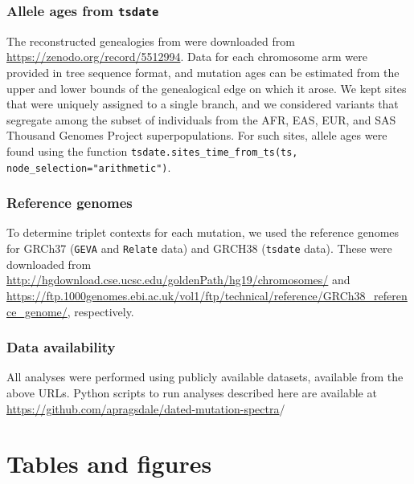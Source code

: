 \documentclass[]{article}
\newcommand{\GEVA}{\texttt{GEVA}\xspace}
\newcommand{\tsdate}{\texttt{tsdate}\xspace}
\newcommand{\relate}{\texttt{Relate}\xspace}
\begin{document}
\subsubsection*{Allele ages from \tsdate}

The reconstructed genealogies from \citet{wohns2022unified} were downloaded
from \url{https://zenodo.org/record/5512994}. Data for each chromosome arm were
provided in tree sequence format, and mutation ages can be estimated from the
upper and lower bounds of the genealogical edge on which it arose. We kept
sites that were uniquely assigned to a single branch, and we considered
variants that segregate among the subset of individuals from the AFR, EAS, EUR,
and SAS Thousand Genomes Project superpopulations. For such sites, allele ages
were found using the function \texttt{tsdate.sites\_time\_from\_ts(ts,
node\_selection="arithmetic")}.

\subsubsection*{Reference genomes} To determine triplet contexts for each
mutation, we used the reference genomes for GRCh37 (\GEVA and \relate data) and
GRCH38 (\tsdate data). These were downloaded from
\url{http://hgdownload.cse.ucsc.edu/goldenPath/hg19/chromosomes/} and
\url{https://ftp.1000genomes.ebi.ac.uk/vol1/ftp/technical/reference/GRCh38_reference_genome/},
respectively.

\subsubsection*{Data availability}

All analyses were performed using publicly available datasets, available from
the above URLs. Python scripts to run analyses described here are available at
\url{https://github.com/apragsdale/dated-mutation-spectra}/




\section*{Tables and figures}
\end{document}
